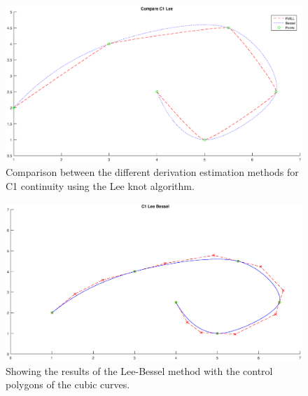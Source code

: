 \documentclass[12pt,a4paper]{article}
\begin{document}
\begin{figure}[hbtp]
\centering
\includegraphics[width=\textwidth]{compC1Lee.eps} 
\caption{Comparison between the different derivation estimation methods for C1 continuity using the Lee knot algorithm.}
\end{figure}

\begin{figure}[hbtp]
\centering
\includegraphics[width=\textwidth]{C1-LeeBessel.eps}
\caption{Showing the results of the Lee-Bessel method with the control polygons of the cubic curves.}
\end{figure}
\end{document}
